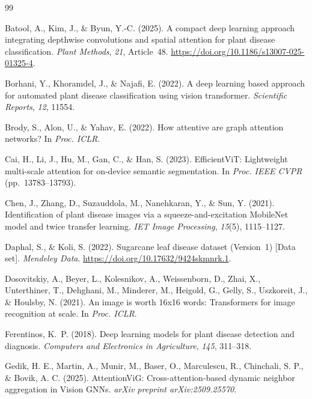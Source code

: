 \documentclass[]{interact}
\theoremstyle{plain}
\theoremstyle{definition}
\theoremstyle{remark}
\begin{document}

\begin{thebibliography}{99}

Batool, A., Kim, J., \& Byun, Y.-C. (2025). A compact deep learning approach integrating depthwise convolutions and spatial attention for plant disease classification. \emph{Plant Methods}, \emph{21}, Article~48. \url{https://doi.org/10.1186/s13007-025-01325-4}.

Borhani, Y., Khoramdel, J., \& Najafi, E. (2022). A deep learning based approach for automated plant disease classification using vision transformer. \emph{Scientific Reports}, \emph{12}, 11554.

Brody, S., Alon, U., \& Yahav, E. (2022). How attentive are graph attention networks? In \emph{Proc. ICLR}.

Cai, H., Li, J., Hu, M., Gan, C., \& Han, S. (2023). EfficientViT: Lightweight multi-scale attention for on-device semantic segmentation. In \emph{Proc. IEEE CVPR} (pp.~13783--13793).

Chen, J., Zhang, D., Suzauddola, M., Nanehkaran, Y., \& Sun, Y. (2021). Identification of plant disease images via a squeeze-and-excitation MobileNet model and twice transfer learning. \emph{IET Image Processing}, \emph{15}(5), 1115--1127.

Daphal, S., \& Koli, S. (2022). Sugarcane leaf disease dataset (Version~1) [Data set]. \emph{Mendeley Data}. \url{https://doi.org/10.17632/9424skmnrk.1}.

Dosovitskiy, A., Beyer, L., Kolesnikov, A., Weissenborn, D., Zhai, X., Unterthiner, T., Dehghani, M., Minderer, M., Heigold, G., Gelly, S., Uszkoreit, J., \& Houlsby, N. (2021). An image is worth 16x16 words: Transformers for image recognition at scale. In \emph{Proc. ICLR}.

Ferentinos, K.~P. (2018). Deep learning models for plant disease detection and diagnosis. \emph{Computers and Electronics in Agriculture}, \emph{145}, 311--318.

Gedik, H. E., Martin, A., Munir, M., Baser, O., Marculescu, R., Chinchali, S. P., \& Bovik, A. C. (2025). AttentionViG: Cross-attention-based dynamic neighbor aggregation in Vision GNNs. \emph{arXiv preprint arXiv:2509.25570}.


\end{thebibliography}
\end{document}
